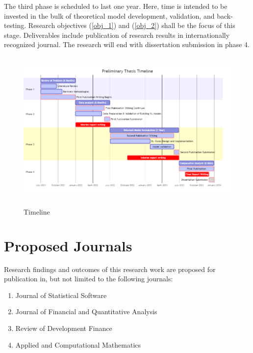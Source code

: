 \documentclass[a4paper,11pt]{scrartcl}
\begin{document}
The third phase is scheduled to last one year. Here, time is intended to be invested in the bulk of theoretical model development, validation, and back-testing. Research objectives (\ref{obj_1}) and (\ref{obj_2}) shall be the focus of this stage. Deliverables include publication of research results in internationally recognized journal. The research will end with dissertation submission in phase 4.
\begin{figure}[htb!]
    \centering
    \includegraphics[width=\textwidth,height=8cm]{mermaid-diagram-2.png}
    \caption{Timeline}
    \label{fig:my_label}
\end{figure}

\section{Proposed Journals}
Research findings and outcomes of this research work are proposed for publication in, but not limited to the following journals:
\begin{enumerate}
    \item Journal of Statistical Software
    \item Journal of Financial and Quantitative Analysis
    \item Review of Development Finance
    \item Applied and Computational Mathematics
\end{enumerate}



\end{document}
